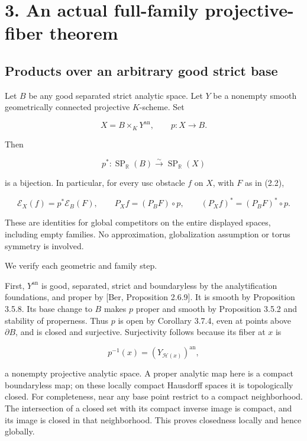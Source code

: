 \documentclass[11pt,a4paper]{article}
\begin{document}
\section*{3. An actual full-family projective-fiber theorem}

\subsection*{Products over an arbitrary good strict base}

Let \(B\) be any good separated strict analytic space. Let \(Y\) be a nonempty smooth geometrically connected projective \(K\)-scheme. Set

\[
X=B\times_K Y^{\mathrm{an}},\qquad p:X\to B.
\]

Then

\[
p^*:\operatorname{SP}_{\mathbb R}(B)
\overset{\sim}{\longrightarrow}\operatorname{SP}_{\mathbb R}(X) \tag{3.1}
\]

is a bijection. In particular, for every usc obstacle \(f\) on \(X\), with \(F\) as in (2.2),

\[
\mathcal E_X(f)=p^*\mathcal E_B(F),\qquad
P_X f=(P_BF)\circ p,
\qquad (P_Xf)^*=(P_BF)^*\circ p. \tag{3.2}
\]

These are identities for global competitors on the entire displayed spaces, including empty families. No approximation, globalization assumption or torus symmetry is involved.

We verify each geometric and family step.

First, \(Y^{\mathrm{an}}\) is good, separated, strict and boundaryless by the analytification foundations, and proper by [Ber, Proposition 2.6.9]. It is smooth by Proposition 3.5.8. Its base change to \(B\) makes \(p\) proper and smooth by Proposition 3.5.2 and stability of properness. Thus \(p\) is open by Corollary 3.7.4, even at points above \(\partial B\), and is closed and surjective. Surjectivity follows because its fiber at \(x\) is

\[
p^{-1}(x)=(Y_{\mathcal H(x)})^{\mathrm{an}}, \tag{3.3}
\]

a nonempty projective analytic space. A proper analytic map here is a compact boundaryless map; on these locally compact Hausdorff spaces it is topologically closed. For completeness, near any base point restrict to a compact neighborhood. The intersection of a closed set with its compact inverse image is compact, and its image is closed in that neighborhood. This proves closedness locally and hence globally.
\end{document}
